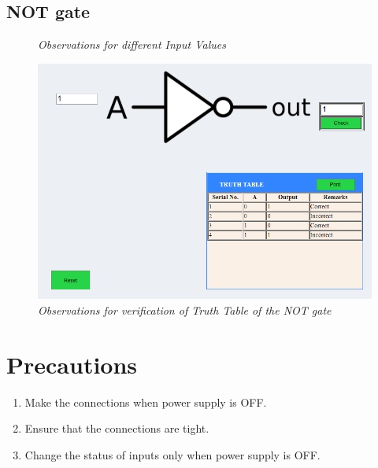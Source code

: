 	\subsection{NOT gate}
			\begin{figure}[ht]
				\centering 
				\hfill
				\caption{\textit{Observations for different Input Values}}
			\end{figure}
			\begin{figure}[h]
				\centering
				\includegraphics[width=0.85\linewidth]{img/exp1/fig18}
				\caption{\textit{Observations for verification of Truth Table of the NOT gate}}
				\label{fig:not_obs_2}
			\end{figure}
			
\section{Precautions}
	\begin{enumerate}
		\tightlist
		\item Make the connections when power supply is OFF.
		\item Ensure that the connections are tight.
		\item Change the status of inputs only when power supply is OFF.
	\end{enumerate}
